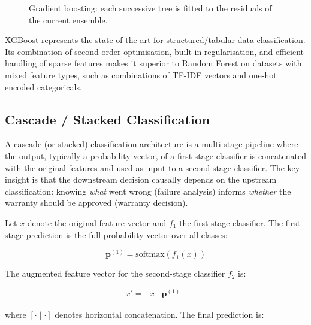 \documentclass[10pt,a4paper]{article}
\begin{document}
\begin{figure}[H]
    \centering
    \caption{Gradient boosting: each successive tree is fitted to the residuals of the current ensemble.}
    \label{fig:gradient-boosting-sequential}
\end{figure}

XGBoost represents the state-of-the-art for structured/tabular data classification. Its combination of second-order optimisation, built-in regularisation, and efficient handling of sparse features makes it superior to Random Forest on datasets with mixed feature types, such as combinations of TF-IDF vectors and one-hot encoded categoricals.

\subsection{Cascade / Stacked Classification}
\label{sec:cascade-classification}

A cascade (or stacked) classification architecture is a multi-stage pipeline where the output, typically a probability vector, of a first-stage classifier is concatenated with the original features and used as input to a second-stage classifier. The key insight is that the downstream decision causally depends on the upstream classification: knowing \emph{what} went wrong (failure analysis) informs \emph{whether} the warranty should be approved (warranty decision).

Let $x$ denote the original feature vector and $f_1$ the first-stage classifier. The first-stage prediction is the full probability vector over all classes:

\begin{equation}
\mathbf{p}^{(1)} = \text{softmax}(f_1(x))
\label{eq:cascade-stage1}
\end{equation}

The augmented feature vector for the second-stage classifier $f_2$ is:

\begin{equation}
x' = [x \mid \mathbf{p}^{(1)}]
\label{eq:cascade-augment}
\end{equation}

where $[\cdot \mid \cdot]$ denotes horizontal concatenation. The final prediction is:
\end{document}
